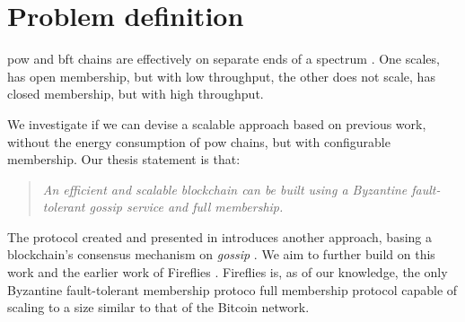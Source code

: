 \documentclass[USenglish]{uit-thesis}
\begin{document}
   

\section{Problem definition}\label{sec:probdef}

\gls{pow} and \gls{bft} chains are effectively on separate ends of a spectrum \cite{quest}.
One scales, has open membership, but with low throughput, the other does not scale, has closed membership, but with high throughput.

We investigate if we can devise a scalable approach based on previous work, without the energy consumption of \gls{pow} chains, but with configurable membership. 
Our thesis statement is that:
\newtheorem{statement}{Statement}
\begin{quote}
	\textit{An efficient and scalable blockchain can be built using a Byzantine fault-tolerant gossip service and full membership.}
\end{quote}

The protocol created and presented in \cite{vanblock} introduces another approach, basing a blockchain's consensus mechanism on \textit{gossip} \cite{epidemic}.
We aim to further build on this work and the earlier work of Fireflies \cite{flies, flies2}.
Fireflies is, as of our knowledge, the only Byzantine fault-tolerant membership protoco full membership protocol capable of scaling to a size similar to that of the Bitcoin network.



\end{document}
